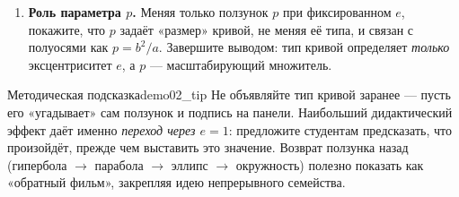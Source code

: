 \begin{enumerate}
  \item \textbf{Роль параметра $p$.} Меняя только ползунок $p$ при
    фиксированном $e$, покажите, что $p$ задаёт «размер» кривой, не меняя её
    типа, и связан с полуосями как $p = b^2/a$. Завершите выводом: тип
    кривой определяет \emph{только} эксцентриситет $e$, а $p$ —
    масштабирующий множитель.
\end{enumerate}

\begin{remarkIT}{Методическая подсказка}{demo02_tip}
  Не объявляйте тип кривой заранее — пусть его «угадывает» сам ползунок и
  подпись на панели. Наибольший дидактический эффект даёт именно
  \emph{переход через $e = 1$}: предложите студентам предсказать, что
  произойдёт, прежде чем выставить это значение. Возврат ползунка назад
  (гипербола $\to$ парабола $\to$ эллипс $\to$ окружность) полезно показать
  как «обратный фильм», закрепляя идею непрерывного семейства.
\end{remarkIT}

